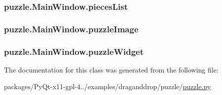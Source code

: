 \subsubsection[{pieces\+List}]{\setlength{\rightskip}{0pt plus 5cm}puzzle.\+Main\+Window.\+pieces\+List}\label{classpuzzle_1_1MainWindow_a5241588c024c5ec13a16b63bb4c79370}
\hypertarget{classpuzzle_1_1MainWindow_a01939a193511a57d877e94f6a3a84d60}{}
\subsubsection[{puzzle\+Image}]{\setlength{\rightskip}{0pt plus 5cm}puzzle.\+Main\+Window.\+puzzle\+Image}\label{classpuzzle_1_1MainWindow_a01939a193511a57d877e94f6a3a84d60}
\hypertarget{classpuzzle_1_1MainWindow_ae17992af20a2f5d56e0d7c6d0a2d8e8f}{}
\subsubsection[{puzzle\+Widget}]{\setlength{\rightskip}{0pt plus 5cm}puzzle.\+Main\+Window.\+puzzle\+Widget}\label{classpuzzle_1_1MainWindow_ae17992af20a2f5d56e0d7c6d0a2d8e8f}


The documentation for this class was generated from the following file\+:\begin{DoxyCompactItemize}
\item 
packages/\+Py\+Qt-\/x11-\/gpl-\/4../examples/draganddrop/puzzle/\hyperlink{draganddrop_2puzzle_2puzzle_8py}{puzzle.\+py}\end{DoxyCompactItemize}
